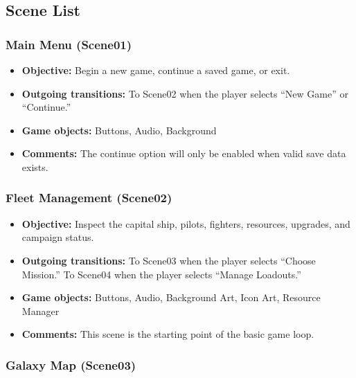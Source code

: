 \documentclass[journal]{IEEEtran}
\begin{document}
\subsection{Scene List}

\subsubsection{Main Menu (Scene01)}

\begin{itemize}
    \item \textbf{Objective:} Begin a new game,
    continue a saved game, or exit.

    \item \textbf{Outgoing transitions:}
    To Scene02 when the player selects ``New Game'' or ``Continue.''

    \item \textbf{Game objects:}
    Buttons, Audio, Background

    \item \textbf{Comments:}
    The continue option will only be enabled when valid save data exists.
\end{itemize}


\subsubsection{Fleet Management (Scene02)}

\begin{itemize}
    \item \textbf{Objective:}
    Inspect the capital ship, pilots, fighters,
    resources, upgrades, and campaign status.

    \item \textbf{Outgoing transitions:}
    To Scene03 when the player selects ``Choose Mission.'' 
    To Scene04 when the player selects ``Manage Loadouts.''

    \item \textbf{Game objects:}
    Buttons, Audio, Background Art, Icon Art, Resource Manager

    \item \textbf{Comments:}
    This scene is the starting point of the basic game loop.
\end{itemize}


\subsubsection{Galaxy Map (Scene03)}
\end{document}
